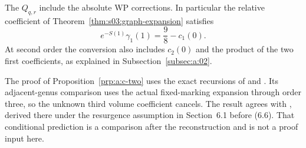 \begin{rmk}
The $Q_{q,r}$ include the absolute WP corrections. In particular
the relative coefficient of Theorem~\ref{thm:s03:graph-expansion}
satisfies
\[
 e^{-S(1)}\gamma_1(1)=\frac98-c_1(0).
\]
At second order the conversion also includes $c_2(0)$ and the product
of the two first coefficients, as explained in
Subsection~\ref{subsec:a:02}.
\end{rmk}

\begin{rmk}
The proof of Proposition~\ref{prp:a:c-two} uses the exact recursions
of \cite[Section~2]{MZ15} and \cite[Theorem~4.3]{HMT25}. Its
adjacent-genus comparison uses the actual fixed-marking expansion
through order three, so the unknown third volume coefficient cancels.
The result agrees with \cite[(6.10)]{EGGLS24}, derived there under
the resurgence assumption in Section~6.1 before (6.6). That conditional
prediction is a comparison after the reconstruction and is not a
proof input here.
\end{rmk}
